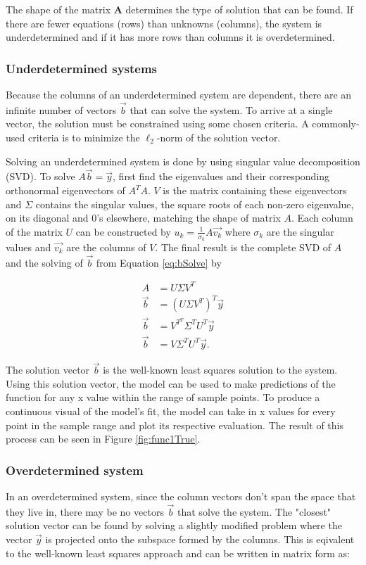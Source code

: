 The shape of the matrix $\mathbf{A}$ determines the type of solution that can be found.  If there are fewer equations (rows) than unknowns (columns), the system is underdetermined and if it has more rows than columns it is overdetermined.  
\subsubsection{Underdetermined systems}
Because the columns of an underdetermined system are dependent, there are an infinite number of vectors $\vec{b}$ that can solve the system.  To arrive at a single vector, the solution must be constrained using some chosen criteria.  A commonly-used criteria is to minimize the $\ell_2$-norm of the solution vector. 

\par Solving an underdetermined system is done by using singular value decomposition (SVD)\cite{linAlg-book}. To solve $A\vec{b}=\vec{y}$, first find the eigenvalues and their corresponding orthonormal eigenvectors of $A^TA$. $V$ is the matrix containing these eigenvectors and $\Sigma$ contains the singular values, the square roots of each non-zero eigenvalue, on its diagonal and $0$'s elsewhere, matching the shape of matrix $A$. Each column of the matrix $U$ can be constructed by $u_k=\frac{1}{\sigma_k}A\vec{v_k}$ where $\sigma_k$ are the singular values and $\vec{v_k}$ are the columns of $V$. The final result is the complete SVD of $A$ and the solving of $\vec{b}$ from Equation \ref{eq:bSolve} by

\begin{align}
A & =U\Sigma V^T \\
\vec{b} &= (U\Sigma V^T)^T\vec{y} \\
\vec{b} &= V^{T^T}\Sigma^TU^T\vec{y} \\
\vec{b} &= V\Sigma^TU^T\vec{y}.
\end{align}

The solution vector $\vec{b}$ is the well-known least squares solution to the system. Using this solution vector, the model can be used to make predictions of the function for any x value within the range of sample points. To produce a continuous visual of the model's fit, the model can take in x values for every point in the sample range and plot its respective evaluation. The result of this process can be seen in Figure \ref{fig:func1True}.

\subsubsection{Overdetermined system}
In an overdetermined system, since the column vectors don't span the space that they live in, there may be no vectors $\vec{b}$ that solve the system.  The "closest" solution vector can be found by solving a slightly modified problem where the vector $\vec{y}$ is projected onto the subspace formed by the columns.  This is eqivalent to the well-known least squares approach and can be written in matrix form as:

